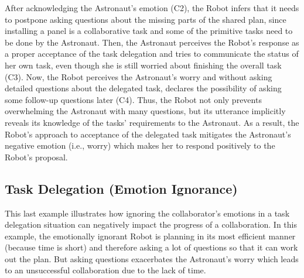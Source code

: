 After acknowledging the Astronaut's emotion (C2), the Robot infers that it needs
to postpone asking questions about the missing parts of the shared plan, since
installing a panel is a collaborative task and some of the primitive tasks need
to be done by the Astronaut. Then, the Astronaut perceives the Robot's response
as a proper acceptance of the task delegation and tries to communicate the
status of her own task, even though she is still worried about finishing the
overall task (C3). Now, the Robot perceives the Astronaut's worry and without
asking detailed questions about the delegated task, declares the possibility of
asking some follow-up questions later (C4). Thus, the Robot not only prevents
overwhelming the Astronaut with many questions, but its utterance implicitly
reveals its knowledge of the tasks' requirements to the Astronaut. As a result,
the Robot's approach to acceptance of the delegated task mitigates the
Astronaut's negative emotion (i.e., worry) which makes her to respond positively
to the Robot's proposal.

\subsection{Task Delegation (Emotion Ignorance)}
\label{sec:exp4}

This last example illustrates how ignoring the collaborator's emotions in a task
delegation situation can negatively impact the progress of a collaboration. In
this example, the emotionally ignorant Robot is planning in its most efficient
manner (because time is short) and therefore asking a lot of questions so that
it can work out the plan. But asking questions exacerbates the Astronaut's worry
which leads to an unsuccessful collaboration due to the lack of time.


